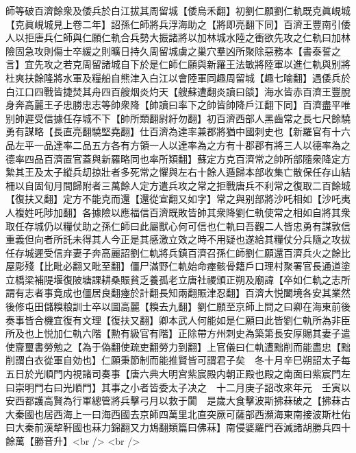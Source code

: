 師等破百濟餘衆及倭兵於白江拔其周留城【倭烏禾翻】初劉仁願劉仁軌既克眞峴城【克眞峴城見上卷二年】詔孫仁師將兵浮海助之【將即亮翻下同】百濟王豐南引倭人以拒唐兵仁師與仁願仁軌合兵勢大振諸將以加林城水陸之衝欲先攻之仁軌曰加林險固急攻則傷士卒緩之則曠日持久周留城虜之巢穴羣凶所聚除惡務本【書泰誓之言】宜先攻之若克周留諸城自下於是仁師仁願與新羅王法敏將陸軍以進仁軌與别將杜爽扶餘隆將水軍及糧船自熊津入白江以會陸軍同趣周留城【趣七喻翻】遇倭兵於白江口四戰皆捷焚其舟四百艘烟炎灼天【艘蘇遭翻炎讀曰燄】海水皆赤百濟王豐脫身奔高麗王子忠勝忠志等帥衆降【帥讀曰率下之帥皆帥降戶江翻下同】百濟盡平唯别帥遲受信據任存城不下【帥所類翻尉紆勿翻】初百濟西部人黑齒常之長七尺餘驍勇有謀略【長直亮翻驍堅堯翻】仕百濟為達率兼郡將猶中國刺史也【新羅官有十六品左平一品達率二品五方各有方領一人以達率為之方有十郡郡有將三人以德率為之德率四品百濟置官蓋與新羅略同也率所類翻】蘇定方克百濟常之帥所部隨衆降定方縶其王及太子縱兵刧掠壯者多死常之懼與左右十餘人遁歸本部收集亡散保任存山結柵以自固旬月間歸附者三萬餘人定方遣兵攻之常之拒戰唐兵不利常之復取二百餘城【復扶又翻】定方不能克而還【還從宣翻又如字】常之與别部將沙吒相如【沙吒夷人複姓吒陟加翻】各據險以應福信百濟既敗皆帥其衆降劉仁軌使常之相如自將其衆取任存城仍以糧仗助之孫仁師曰此屬獸心何可信也仁軌曰吾觀二人皆忠勇有謀敦信重義但向者所託未得其人今正是其感激立效之時不用疑也遂給其糧仗分兵隨之攻拔任存城遲受信弃妻子奔高麗詔劉仁軌將兵鎮百濟召孫仁師劉仁願還百濟兵火之餘比屋彫殘【比毗必翻又毗至翻】僵尸滿野仁軌始命瘞骸骨籍戶口理村聚署官長通道塗立橋梁補隄堰復陂塘課耕桑賑貧乏養孤老立唐社禝頒正朔及廟諱【卒如仁軌之志所謂有志者事竟成也僵居良翻瘞於計翻長知兩翻賑津忍翻】百濟大悦闔境各安其業然後修屯田儲糗粮訓士卒以圖高麗【糗去九翻】劉仁願至京師上問之曰卿在海東前後奏事皆合機宜復有文理【復扶又翻】卿本武人何能如是仁願曰此皆劉仁軌所為非臣所及也上悦加仁軌六階【勲有級官有階】正除帶方州刺史為築第長安厚賜其妻子遣使齎璽書勞勉之【為于偽翻使疏吏翻勞力到翻】上官儀曰仁軌遭黜削而能盡忠【黜削謂白衣從軍自効也】仁願秉節制而能推賢皆可謂君子矣　冬十月辛巳朔詔太子每五日於光順門内視諸司奏事【唐六典大明宫紫宸殿内朝正殿也殿之南面曰紫宸門左曰崇明門右曰光順門】其事之小者皆委太子决之　十二月庚子詔改來年元　壬寅以安西都護高賢為行軍總管將兵擊弓月以救于闐　是歲大食擊波斯拂菻破之【拂菻古大秦國也居西海上一曰海西國去京師四萬里北直突厥可薩部西瀕海東南接波斯杜佑曰大秦前漢犂靬國也菻力錦翻又力鴆翻類篇曰佛菻】南侵婆羅門吞滅諸胡勝兵四十餘萬【勝音升】<br />
<br />
